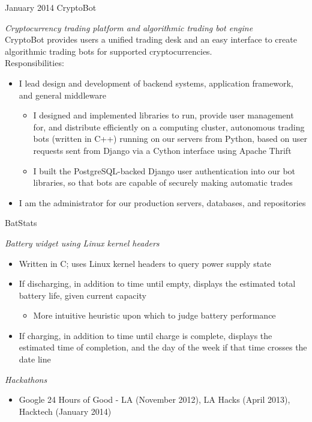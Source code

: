 \documentclass[]{mills-cv} %
\begin{document}
\begin{entrylist}
\entry
{January 2014}
{CryptoBot}
{}
{\emph{Cryptocurrency trading platform and algorithmic trading bot engine} \\
CryptoBot provides users a unified trading desk and an easy interface to create algorithmic trading bots for supported cryptocurrencies. \\
Responsibilities:
\begin{itemize}
\item I lead design and development of backend systems, application framework, and general middleware
\begin{itemize}
\item I designed and implemented libraries to run, provide user management for, and distribute efficiently on a computing cluster, autonomous trading bots (written in C++) running on our servers from Python, based on user requests sent from Django via a Cython interface using Apache Thrift
\item I built the PostgreSQL-backed Django user authentication into our bot libraries, so that bots are capable of securely making automatic trades
\end{itemize}
\item I am the administrator for our production servers, databases, and repositories
\end{itemize}
}

\entry
{}
{BatStats}
{}
{\emph{Battery widget using Linux kernel headers}
\begin{itemize}
\item Written in C; uses Linux kernel headers to query power supply state
\item If discharging, in addition to time until empty, displays the estimated total battery life, given current capacity
\begin{itemize}
\item More intuitive heuristic upon which to judge battery performance
\end{itemize}
\item If charging, in addition to time until charge is complete, displays the estimated time of completion, and the day of the week if that time crosses the date line
\end{itemize}
\emph{Hackathons}
\begin{itemize}
\item Google 24 Hours of Good - LA (November 2012), LA Hacks (April 2013), \\ Hacktech (January 2014)
\end{itemize}}
\end{entrylist}
\end{document}
